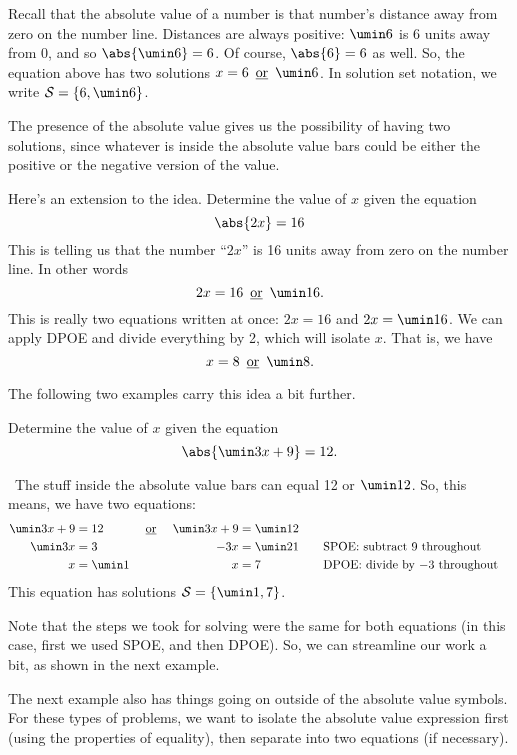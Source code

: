 Recall that the absolute value of a number is that number's distance away from zero on the number line. Distances are always positive: $\umin6$ is 6 units away from 0, and so $\abs{\umin6}=6$. Of course, $\abs{6} = 6$ as well. So, the equation above has two solutions $x = 6 \OR \umin6$. In solution set notation, we write $\solset{6, \umin6}$.

The presence of the absolute value gives us the possibility of having two solutions, since whatever is inside the absolute value bars could be either the positive or the negative version of the value.

Here's an extension to the idea. Determine the value of $x$ given the equation \[\abs{2x} = 16\]
This is telling us that the number ``$2x$'' is 16 units away from zero on the number line. In other words \[2x = 16 \OR \umin16.\]
This is really two equations written at once: $2x = 16$ and $2x = \umin16$. We can apply DPOE and divide everything by 2, which will isolate $x$. That is, we have \[x = 8 \OR \umin8.\]

The following two examples carry this idea a bit further.

\begin{boxedex}
Determine the value of $x$ given the equation \[\abs{\umin3x+9} = 12.\]

\exsoln\ The stuff inside the absolute value bars can equal 12 or $\umin12$. So, this means, we have two equations:
\[\begin{aligned}
\umin3x + 9 &= 12 	&\OR 	&&\umin3x + 9 &= \umin12\\
\umin3x  &= 3 		&	 	&&-3x &= \umin21
&&\text{\quad SPOE: subtract 9 throughout}\\
x &= \umin1 		&	 	&&x &= 7
&&\text{\quad DPOE: divide by $-3$ throughout}\\
\end{aligned}\]
This equation has solutions $\solset{\umin1, 7}$.
\end{boxedex}

Note that the steps we took for solving were the same for both equations (in this case, first we used SPOE, and then DPOE). So, we can streamline our work a bit, as shown in the next example.

The next example also has things going on outside of the absolute value symbols. For these types of problems, we want to isolate the absolute value expression first (using the properties of equality), then separate into two equations (if necessary).

